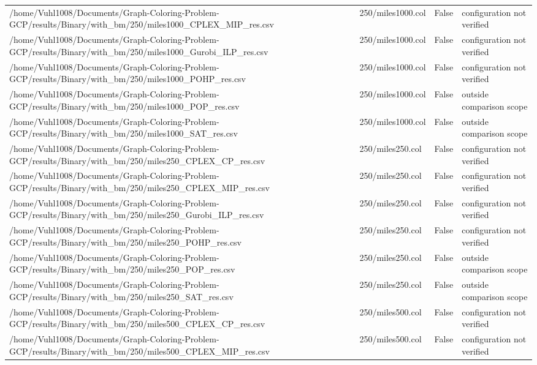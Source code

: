 \begin{table}[htbp]
\begin{tabular}{llll}
/home/Vuhl1008/Documents/Graph-Coloring-Problem-GCP/results/Binary/with\_bm/250/miles1000\_CPLEX\_MIP\_res.csv & 250/miles1000.col & False & configuration not verified \\
/home/Vuhl1008/Documents/Graph-Coloring-Problem-GCP/results/Binary/with\_bm/250/miles1000\_Gurobi\_ILP\_res.csv & 250/miles1000.col & False & configuration not verified \\
/home/Vuhl1008/Documents/Graph-Coloring-Problem-GCP/results/Binary/with\_bm/250/miles1000\_POHP\_res.csv & 250/miles1000.col & False & configuration not verified \\
/home/Vuhl1008/Documents/Graph-Coloring-Problem-GCP/results/Binary/with\_bm/250/miles1000\_POP\_res.csv & 250/miles1000.col & False & outside comparison scope \\
/home/Vuhl1008/Documents/Graph-Coloring-Problem-GCP/results/Binary/with\_bm/250/miles1000\_SAT\_res.csv & 250/miles1000.col & False & outside comparison scope \\
/home/Vuhl1008/Documents/Graph-Coloring-Problem-GCP/results/Binary/with\_bm/250/miles250\_CPLEX\_CP\_res.csv & 250/miles250.col & False & configuration not verified \\
/home/Vuhl1008/Documents/Graph-Coloring-Problem-GCP/results/Binary/with\_bm/250/miles250\_CPLEX\_MIP\_res.csv & 250/miles250.col & False & configuration not verified \\
/home/Vuhl1008/Documents/Graph-Coloring-Problem-GCP/results/Binary/with\_bm/250/miles250\_Gurobi\_ILP\_res.csv & 250/miles250.col & False & configuration not verified \\
/home/Vuhl1008/Documents/Graph-Coloring-Problem-GCP/results/Binary/with\_bm/250/miles250\_POHP\_res.csv & 250/miles250.col & False & configuration not verified \\
/home/Vuhl1008/Documents/Graph-Coloring-Problem-GCP/results/Binary/with\_bm/250/miles250\_POP\_res.csv & 250/miles250.col & False & outside comparison scope \\
/home/Vuhl1008/Documents/Graph-Coloring-Problem-GCP/results/Binary/with\_bm/250/miles250\_SAT\_res.csv & 250/miles250.col & False & outside comparison scope \\
/home/Vuhl1008/Documents/Graph-Coloring-Problem-GCP/results/Binary/with\_bm/250/miles500\_CPLEX\_CP\_res.csv & 250/miles500.col & False & configuration not verified \\
/home/Vuhl1008/Documents/Graph-Coloring-Problem-GCP/results/Binary/with\_bm/250/miles500\_CPLEX\_MIP\_res.csv & 250/miles500.col & False & configuration not verified \\

\end{tabular}
\end{table}
